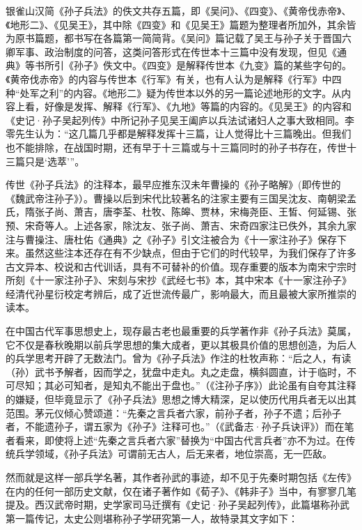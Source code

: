 \documentclass[12pt,UTF8]{ctexbook}
\begin{document}
银雀山汉简《孙子兵法》的佚文共存五篇，即《吴问》、《四变》、《黄帝伐赤帝》、《地形二》、《见吴王》，其中除《四变》和《见吴王》篇题为整理者所加外，其余皆为原书篇题，都书写在各篇第一简简背。《吴问》篇记载了吴王与孙子关于晋国六卿军事、政治制度的问答，这类问答形式在传世本十三篇中没有发现，但见《通典》等书所引《孙子》佚文中。《四变》是解释传世本《九变》篇的某些字句的。《黄帝伐赤帝》的内容与传世本《行军》有关，也有人认为是解释《行军》中四种“处军之利”的内容。《地形二》疑为传世本以外的另一篇论述地形的文字。从内容上看，好像是发挥、解释《行军》、《九地》等篇的内容的。《见吴王》的内容和《史记·孙子吴起列传》中所记孙子见吴王阖庐以兵法试诸妇人之事大致相同。李零先生认为：“这几篇几乎都是解释发挥十三篇，让人觉得比十三篇晚出。但我们也不能排除，在战国时期，还有早于十三篇或与十三篇同时的孙子书存在，传世十三篇只是‘选萃’”。

传世《孙子兵法》的注释本，最早应推东汉未年曹操的《孙子略解》(即传世的《魏武帝注孙子》）。曹操以后到宋代比较著名的注家主要有三国吴沈友、南朝梁孟氏，隋张子尚、萧吉，唐李荃、杜牧、陈皞、贾林，宋梅尧臣、王皙、何延锡、张预、宋奇等人。上述各家，除沈友、张子尚、萧吉、宋奇四家注已佚外，其余九家注与曹操注、唐杜佑《通典》之《孙子》引文注被合为《十一家注孙子》保存下来。虽然这些注本还存在有不少缺点，但由于它们的时代较早，为我们保存了许多古文异本、校说和古代训话，具有不可替补的价值。现存重要的版本为南宋宁宗时所刻《十一家注孙子》、宋刻与宋抄《武经七书》本，其中宋本《十一家注孙子》经清代孙星衍校定考辨后，成了近世流传最广，影响最大，而且最被大家所推崇的读本。

在中国古代军事思想史上，现存最古老也最重要的兵学著作非《孙子兵法》莫属，它不仅是春秋晚期以前兵学思想的集大成者，更以其极具价值的思想创造，为后人的兵学思考开辟了无数法门。曾为《孙子兵法》作注的杜牧声称：“后之人，有读（孙）武书予解者，因而学之，犹盘中走丸。丸之走盘，横斜圆直，计于临时，不可尽知；其必可知者，是知丸不能出于盘也。”（《注孙子序》）此论虽有自夸其注释的嫌疑，但毕竟显示了《孙子兵法》思想之博大精深，足以使历代用兵者无以出其范围。茅元仪倾心赞颂道：“先秦之言兵者六家，前孙子者，孙子不遗；后孙子者，不能遗孙子，谓五家为《孙子》注释可也。”（《武备志·孙子兵诀评》）而在笔者看来，即使将上述“先秦之言兵者六家”替换为“中国古代言兵者”亦不为过。在传统兵学领域，《孙子兵法》可谓前无古人，后无来者，地位崇高，无一匹敌。

然而就是这样一部兵学名著，其作者孙武的事迹，却不见于先秦时期包括《左传》在内的任何一部历史文献，仅在诸子著作如《荀子》、《韩非子》当中，有寥寥几笔提及。西汉武帝时期，史学家司马迁撰有《史记·孙子吴起列传》，此篇堪称孙武第一篇传记，太史公则堪称孙子学研究第一人，故特录其文字如下：
\end{document}
